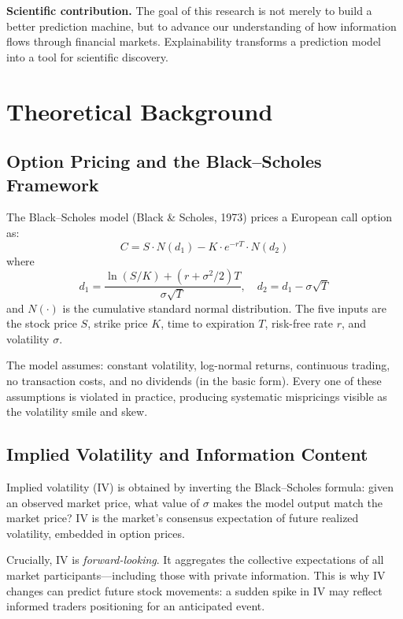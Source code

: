 \documentclass[11pt,a4paper]{article}
\begin{document}
\textbf{Scientific contribution.} The goal of this research is not merely to build a better prediction machine, but to advance our understanding of how information flows through financial markets. Explainability transforms a prediction model into a tool for scientific discovery.


\section{Theoretical Background}

\subsection{Option Pricing and the Black--Scholes Framework}

The Black--Scholes model (Black \& Scholes, 1973) prices a European call option as:
\begin{equation}
C = S \cdot N(d_1) - K \cdot e^{-rT} \cdot N(d_2)
\end{equation}
where
\begin{equation}
d_1 = \frac{\ln(S/K) + (r + \sigma^2/2)T}{\sigma\sqrt{T}}, \quad d_2 = d_1 - \sigma\sqrt{T}
\end{equation}
and $N(\cdot)$ is the cumulative standard normal distribution. The five inputs are the stock price $S$, strike price $K$, time to expiration $T$, risk-free rate $r$, and volatility $\sigma$.

The model assumes: constant volatility, log-normal returns, continuous trading, no transaction costs, and no dividends (in the basic form). Every one of these assumptions is violated in practice, producing systematic mispricings visible as the volatility smile and skew.

\subsection{Implied Volatility and Information Content}

Implied volatility (IV) is obtained by inverting the Black--Scholes formula: given an observed market price, what value of $\sigma$ makes the model output match the market price? IV is the market's consensus expectation of future realized volatility, embedded in option prices.

Crucially, IV is \emph{forward-looking}. It aggregates the collective expectations of all market participants---including those with private information. This is why IV changes can predict future stock movements: a sudden spike in IV may reflect informed traders positioning for an anticipated event.
\end{document}
